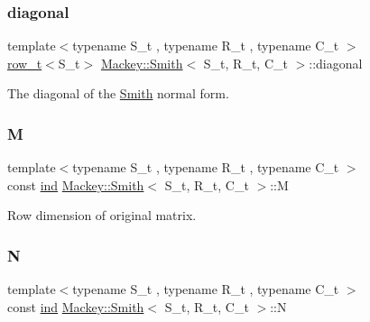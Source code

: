 \subsubsection{\texorpdfstring{diagonal}{diagonal}}
{\footnotesize\ttfamily template$<$typename S\+\_\+t , typename R\+\_\+t , typename C\+\_\+t $>$ \\
\hyperlink{namespaceMackey_a6d37801553e585770ca7d1243ab3b213}{row\+\_\+t}$<$S\+\_\+t$>$ \hyperlink{classMackey_1_1Smith}{Mackey\+::\+Smith}$<$ S\+\_\+t, R\+\_\+t, C\+\_\+t $>$\+::diagonal}



The diagonal of the \hyperlink{classMackey_1_1Smith}{Smith} normal form. 

\mbox{\label{classMackey_1_1Smith_aa4bddfb9796689478f536486bb5d5524}} 
\subsubsection{\texorpdfstring{M}{M}}
{\footnotesize\ttfamily template$<$typename S\+\_\+t , typename R\+\_\+t , typename C\+\_\+t $>$ \\
const \hyperlink{classMackey_1_1Smith_acf2eec378d950576afd70dc941cad0c4}{ind} \hyperlink{classMackey_1_1Smith}{Mackey\+::\+Smith}$<$ S\+\_\+t, R\+\_\+t, C\+\_\+t $>$\+::M\hspace{0.3cm}{\ttfamily [protected]}}



Row dimension of original matrix. 

\mbox{\label{classMackey_1_1Smith_a9598fe3978cc86a83e4f3b03a418ad5c}} 
\subsubsection{\texorpdfstring{N}{N}}
{\footnotesize\ttfamily template$<$typename S\+\_\+t , typename R\+\_\+t , typename C\+\_\+t $>$ \\
const \hyperlink{classMackey_1_1Smith_acf2eec378d950576afd70dc941cad0c4}{ind} \hyperlink{classMackey_1_1Smith}{Mackey\+::\+Smith}$<$ S\+\_\+t, R\+\_\+t, C\+\_\+t $>$\+::N\hspace{0.3cm}{\ttfamily [protected]}}



